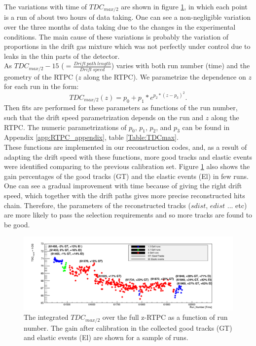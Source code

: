 The variations with time of $TDC_{max/2}$ are shown in figure \ref{fig:Drift_run_number}, in which each point is a run of about two hours of data taking. One can see a non-negligible variation over the three months of data taking due to the changes in the experimental conditions. The main cause of these variations is probably the variation of proportions in the drift gas mixture which was not perfectly under control due to leaks in the thin parts of the detector.\\

As $TDC_{max/2} -15 $ ($= 
\frac{Drift~path~length}{Drift~speed}$) varies with both run number (time) and 
the geometry of the RTPC ($z$ along the RTPC). We
parametrize the dependence on $z$ for each run in the form:\\
\begin{equation}
TDC_{max/2} (z)= p_{0} +  p_{1} * e^{p_{2}*(z-p_{3})^{2}}.
\label{equ:drift_speed_fit}
\end{equation}
Then fits are performed for these parameters as functions of the run number, such that the drift speed parametrization depends on the run and $z$ along the RTPC. The numeric parametrizations of $p_{0}$, $p_{1}$, $p_{2}$, and $p_{3}$ can be found in Appendix \ref{app:RTPC_appendix}, table \ref{Table:TDCmax}. \\

These functions are implemented in our reconstruction codes, and, as a result 
of adapting the drift speed with these functions, more good tracks and elastic 
events were identified comparing to the previous calibration set. Figure 
\ref{fig:Drift_run_number} also shows the gain percentages of the good tracks 
(GT) and the elastic events (El) in few runs. One can see a gradual improvement 
with time because of giving the right drift speed, which together with the 
drift paths gives more precise reconstructed hits chain. Therefore, the 
parameters of the reconstructed tracks ($sdist$, $edist$ ... etc) are more likely to pass the 
selection requirements and so more tracks are found to be good. \\


\begin{figure}[tp]
\hspace{-0.3in}
\includegraphics[scale=0.45]{fig_rtpc/Drift_run_number.png}
\caption{ The integrated $TDC_{max/2}$ over the full z-RTPC as a function of 
run number.  The gain after calibration in the collected good tracks (GT) and 
elastic events (El) are shown for a sample of runs.}
\label{fig:Drift_run_number}
\end{figure} 

